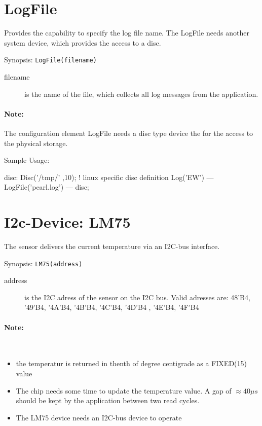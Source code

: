 \section{LogFile}
Provides the capability to specify the log file name.
The LogFile needs another system device, which provides the access to a 
disc.

Synopsis: \texttt{LogFile(filename)}

\begin{description}
\item[filename]  is the name of the file, which collects all log messages
   from the application.
\end{description}

\paragraph{Note:} The configuration element LogFile needs a disc type device
  the for the access to the physical storage.
 

Sample Usage:
\begin{PEARLCode}
disc: Disc('/tmp/' ,10); ! linux specific disc definition
Log('EW') --- LogFile('pearl.log') --- disc;
\end{PEARLCode}

\section{I2c-Device: LM75}
The sensor delivers the current temperature via an I2C-bus interface.

Synopsis: \texttt{LM75(address)}

\begin{description}
\item[address] is the I2C adress of the sensor on the I2C bus.
   Valid adresses are: 48'B4, '49'B4, '4A'B4, '4B'B4,
            '4C'B4, '4D'B4 , '4E'B4, '4F'B4
\end{description}

\paragraph{Note:}\ 
\begin{itemize}
\item the temperatur is returned in thenth of degree centigrade as a 
    FIXED(15) value
\item The chip needs some time to update the temperature value. A gap of
   $\approx 40\mu s$ should be kept by the application between two read cycles.
\item The LM75 device needs an I2C-bus device to operate
\end{itemize}


